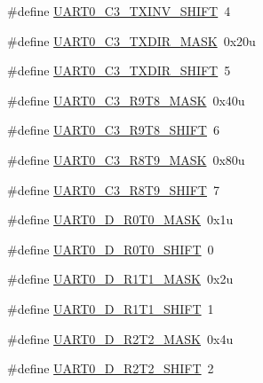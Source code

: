 \begin{DoxyCompactItemize}
\item 
\#define \hyperlink{group___u_a_r_t0___register___masks_ga7866d64fd9c0f5acb07399d3d575902f}{U\+A\+R\+T0\+\_\+\+C3\+\_\+\+T\+X\+I\+N\+V\+\_\+\+S\+H\+I\+FT}~4
\item 
\#define \hyperlink{group___u_a_r_t0___register___masks_gae1d9928e86dff5aff4ba866ce4c26476}{U\+A\+R\+T0\+\_\+\+C3\+\_\+\+T\+X\+D\+I\+R\+\_\+\+M\+A\+SK}~0x20u
\item 
\#define \hyperlink{group___u_a_r_t0___register___masks_ga8fd1bcbe36bf2b15e1f5bcd945271fd5}{U\+A\+R\+T0\+\_\+\+C3\+\_\+\+T\+X\+D\+I\+R\+\_\+\+S\+H\+I\+FT}~5
\item 
\#define \hyperlink{group___u_a_r_t0___register___masks_gafa2d2629bdfbedfd82f87d7abe60ef25}{U\+A\+R\+T0\+\_\+\+C3\+\_\+\+R9\+T8\+\_\+\+M\+A\+SK}~0x40u
\item 
\#define \hyperlink{group___u_a_r_t0___register___masks_gac12f14417be540ea9b0a593ff16ab0cc}{U\+A\+R\+T0\+\_\+\+C3\+\_\+\+R9\+T8\+\_\+\+S\+H\+I\+FT}~6
\item 
\#define \hyperlink{group___u_a_r_t0___register___masks_ga97ddd31ea21c76d2e25425f34a5ceeae}{U\+A\+R\+T0\+\_\+\+C3\+\_\+\+R8\+T9\+\_\+\+M\+A\+SK}~0x80u
\item 
\#define \hyperlink{group___u_a_r_t0___register___masks_ga18a7c7bb418d9b5cf9149d7feb365da3}{U\+A\+R\+T0\+\_\+\+C3\+\_\+\+R8\+T9\+\_\+\+S\+H\+I\+FT}~7
\item 
\#define \hyperlink{group___u_a_r_t0___register___masks_gafb52d25fd02d9e7f20c4e2c15b1b4582}{U\+A\+R\+T0\+\_\+\+D\+\_\+\+R0\+T0\+\_\+\+M\+A\+SK}~0x1u
\item 
\#define \hyperlink{group___u_a_r_t0___register___masks_gad74330f7b3c879005943f6bfb6641578}{U\+A\+R\+T0\+\_\+\+D\+\_\+\+R0\+T0\+\_\+\+S\+H\+I\+FT}~0
\item 
\#define \hyperlink{group___u_a_r_t0___register___masks_ga814724f492eb31ac3d56cf7b4c639cdf}{U\+A\+R\+T0\+\_\+\+D\+\_\+\+R1\+T1\+\_\+\+M\+A\+SK}~0x2u
\item 
\#define \hyperlink{group___u_a_r_t0___register___masks_ga1032022de13132a13b5e09a30839b493}{U\+A\+R\+T0\+\_\+\+D\+\_\+\+R1\+T1\+\_\+\+S\+H\+I\+FT}~1
\item 
\#define \hyperlink{group___u_a_r_t0___register___masks_gaa584f3ebf164a497e3008771d511fc7b}{U\+A\+R\+T0\+\_\+\+D\+\_\+\+R2\+T2\+\_\+\+M\+A\+SK}~0x4u
\item 
\#define \hyperlink{group___u_a_r_t0___register___masks_ga8fbb4283aa79977ed0f576dfd3960f64}{U\+A\+R\+T0\+\_\+\+D\+\_\+\+R2\+T2\+\_\+\+S\+H\+I\+FT}~2
\item 

\end{DoxyCompactItemize}
